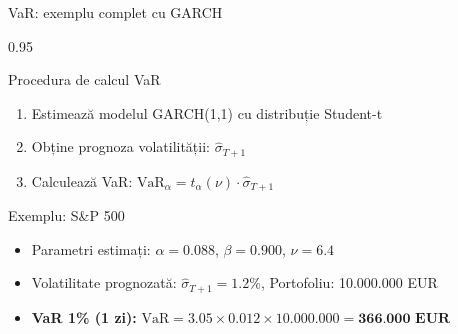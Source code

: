\documentclass[9pt, aspectratio=169, t]{beamer}
\begin{document}
\begin{frame}{VaR: exemplu complet cu GARCH}
    \begin{cminipage}{0.95\textwidth}
        \begin{block}{Procedura de calcul VaR}
            \begin{enumerate}\setlength{\itemsep}{0pt}
                \item Estimează modelul GARCH(1,1) cu distribuție Student-t
                \item Obține prognoza volatilității: $\hat{\sigma}_{T+1}$
                \item Calculează VaR: $\text{VaR}_\alpha = t_\alpha(\nu) \cdot \hat{\sigma}_{T+1}$
            \end{enumerate}
        \end{block}

        \vspace{-0.1cm}
        \begin{exampleblock}{Exemplu: S\&P 500}
            \begin{itemize}\setlength{\itemsep}{0pt}
                \item Parametri estimați: $\alpha = 0.088$, $\beta = 0.900$, $\nu = 6.4$
                \item Volatilitate prognozată: $\hat{\sigma}_{T+1} = 1.2\%$, Portofoliu: 10.000.000 EUR
                \item \textbf{VaR 1\% (1 zi):} $\text{VaR} = 3.05 \times 0.012 \times 10.000.000 = \textbf{366.000 EUR}$
            \end{itemize}
        \end{exampleblock}
    \end{cminipage}
\end{frame}
\end{document}
